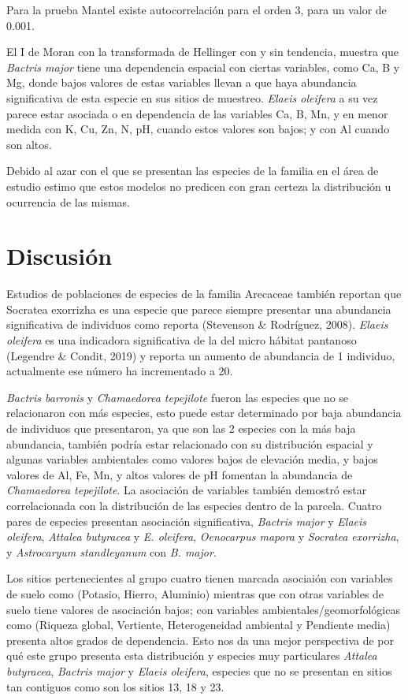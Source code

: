 \documentclass[11pt,]{article}
\begin{document}
Para la prueba Mantel existe autocorrelación para el orden 3, para un
valor de 0.001.

El I de Moran con la transformada de Hellinger con y sin tendencia,
muestra que \emph{Bactris major} tiene una dependencia espacial con
ciertas variables, como Ca, B y Mg, donde bajos valores de estas
variables llevan a que haya abundancia significativa de esta especie en
sus sitios de muestreo. \emph{Elaeis oleifera} a su vez parece estar
asociada o en dependencia de las variables Ca, B, Mn, y en menor medida
con K, Cu, Zn, N, pH, cuando estos valores son bajos; y con Al cuando
son altos.

Debido al azar con el que se presentan las especies de la familia en el
área de estudio estimo que estos modelos no predicen con gran certeza la
distribución u ocurrencia de las mismas.

\section{Discusión}\label{discusiuxf3n}

Estudios de poblaciones de especies de la familia Arecaceae también
reportan que Socratea exorrizha es una especie que parece siempre
presentar una abundancia significativa de individuos como reporta
(Stevenson \& Rodríguez, 2008). \emph{Elaeis oleifera} es una indicadora
significativa de la del micro hábitat pantanoso (Legendre \& Condit,
2019) y reporta un aumento de abundancia de 1 individuo, actualmente ese
número ha incrementado a 20.

\emph{Bactris barronis} y \emph{Chamaedorea tepejilote} fueron las
especies que no se relacionaron con más especies, esto puede estar
determinado por baja abundancia de individuos que presentaron, ya que
son las 2 especies con la más baja abundancia, también podría estar
relacionado con su distribución espacial y algunas variables ambientales
como valores bajos de elevación media, y bajos valores de Al, Fe, Mn, y
altos valores de pH fomentan la abundancia de \emph{Chamaedorea
tepejilote}. La asociación de variables también demostró estar
correlacionada con la distribución de las especies dentro de la parcela.
Cuatro pares de especies presentan asociación significativa,
\emph{Bactris major} y \emph{Elaeis oleifera}, \emph{Attalea butyracea}
y \emph{E. oleifera}, \emph{Oenocarpus mapora} y \emph{Socratea
exorrizha}, y \emph{Astrocaryum standleyanum} con \emph{B. major}.

Los sitios pertenecientes al grupo cuatro tienen marcada asociaión con
variables de suelo como (Potasio, Hierro, Aluminio) mientras que con
otras variables de suelo tiene valores de asociación bajos; con
variables ambientales/geomorfológicas como (Riqueza global, Vertiente,
Heterogeneidad ambiental y Pendiente media) presenta altos grados de
dependencia. Esto nos da una mejor perspectiva de por qué este grupo
presenta esta distribución y especies muy particulares \emph{Attalea
butyracea}, \emph{Bactris major} y \emph{Elaeis oleifera}, especies que
no se presentan en sitios tan contiguos como son los sitios 13, 18 y 23.
\end{document}
